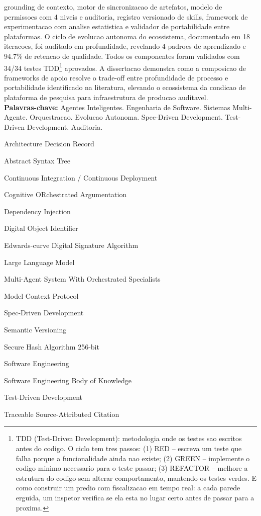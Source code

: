 \documentclass[12pt,a4paper,oneside,sumario=tradicional,chapter=TITLE,section=TITLE,subsection=TITLE,english,brazil]{abntex2}
\begin{document}
\begin{resumoumacoluna}
grounding de contexto, motor de sincronizacao de artefatos, modelo de permissoes com 4 niveis e auditoria, registro versionado de skills, framework de experimentacao com analise estatistica e validador de portabilidade entre plataformas. O ciclo de evolucao autonoma do ecossistema, documentado em 18 iteracoes, foi auditado em profundidade, revelando 4 padroes de aprendizado e 94.7\% de retencao de qualidade. Todos os componentes foram validados com 34/34 testes TDD\footnote{TDD (Test-Driven Development): metodologia onde os testes sao escritos antes do codigo. O ciclo tem tres passos: (1) RED -- escreva um teste que falha porque a funcionalidade ainda nao existe; (2) GREEN -- implemente o codigo minimo necessario para o teste passar; (3) REFACTOR -- melhore a estrutura do codigo sem alterar comportamento, mantendo os testes verdes. E como construir um predio com fiscalizacao em tempo real: a cada parede erguida, um inspetor verifica se ela esta no lugar certo antes de passar para a proxima.} aprovados. A dissertacao demonstra como a composicao de frameworks de apoio resolve o trade-off entre profundidade de processo e portabilidade identificado na literatura, elevando o ecossistema da condicao de plataforma de pesquisa para infraestrutura de producao auditavel.\\\textbf{Palavras-chave:} Agentes Inteligentes. Engenharia de Software. Sistemas Multi-Agente. Orquestracao. Evolucao Autonoma. Spec-Driven Development. Test-Driven Development. Auditoria.
\end{resumoumacoluna}
\listoffigures*\cleardoublepage
{}\listoftables*\cleardoublepage
\begin{siglas}
\item[ADR] Architecture Decision Record\quad\item[AST] Abstract Syntax Tree\quad\item[CI/CD] Continuous Integration / Continuous Deployment\quad\item[CORA] Cognitive ORchestrated Argumentation\quad\item[DI] Dependency Injection\quad\item[DOI] Digital Object Identifier\quad\item[Ed25519] Edwards-curve Digital Signature Algorithm\quad\item[LLM] Large Language Model\quad\item[MASWOS] Multi-Agent System With Orchestrated Specialists\quad\item[MCP] Model Context Protocol\quad\item[SDD] Spec-Driven Development\quad\item[SemVer] Semantic Versioning\quad\item[SHA256] Secure Hash Algorithm 256-bit\quad\item[SWE] Software Engineering\quad\item[SWEBOK] Software Engineering Body of Knowledge\quad\item[TDD] Test-Driven Development\quad\item[TSAC] Traceable Source-Attributed Citation
\end{siglas}
\end{document}
